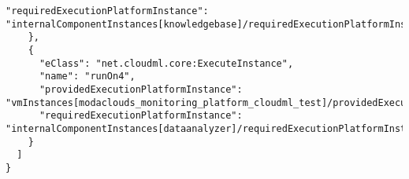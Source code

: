 \begin{lstlisting}[mathescape,caption={The .json to deplot the \mm on Flexiant},label={lst:mpflexi}]
      "requiredExecutionPlatformInstance": "internalComponentInstances[knowledgebase]/requiredExecutionPlatformInstance[vmRequired4]"
    },
    {
      "eClass": "net.cloudml.core:ExecuteInstance",
      "name": "runOn4",
      "providedExecutionPlatformInstance": "vmInstances[modaclouds_monitoring_platform_cloudml_test]/providedExecutionPlatformInstances[vmProvided]",
      "requiredExecutionPlatformInstance": "internalComponentInstances[dataanalyzer]/requiredExecutionPlatformInstance[vmRequired3]"
    }
  ]
}

\end{lstlisting}
